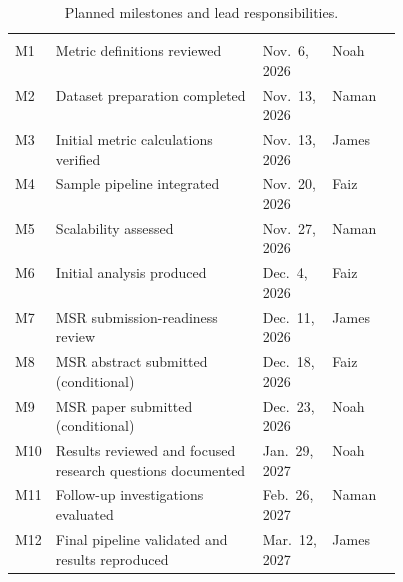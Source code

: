 \begin{singlespace}
\setlength{\LTcapwidth}{\linewidth}
\begin{longtable}{@{}L{0.09\linewidth} L{\tabcolsep\relax} L{0.18\linewidth} L{0.18\linewidth}@{}}
\caption{Planned milestones and lead responsibilities.}\label{tab:proposal-milestones}\\
 &  &  & \\
\midrule
\endfirsthead
{}
 &  &  & \\
\midrule
\endhead
\bottomrule
\endfoot

M1 & Metric definitions reviewed
& Nov.\ 6, 2026 & Noah\\
\addlinespace[3pt]

M2 & Dataset preparation completed
& Nov.\ 13, 2026 & Naman\\
\addlinespace[3pt]

M3 & Initial metric calculations verified
& Nov.\ 13, 2026 & James\\
\addlinespace[3pt]

M4 & Sample pipeline integrated
& Nov.\ 20, 2026 & Faiz\\
\addlinespace[3pt]

M5 & Scalability assessed
& Nov.\ 27, 2026 & Naman\\
\addlinespace[3pt]

M6 & Initial analysis produced
& Dec.\ 4, 2026 & Faiz\\
\addlinespace[3pt]

M7 & MSR submission-readiness review
& Dec.\ 11, 2026 & James\\
\addlinespace[3pt]

M8 & MSR abstract submitted (conditional)
& Dec.\ 18, 2026 & Faiz\\
\addlinespace[3pt]

M9 & MSR paper submitted (conditional)
& Dec.\ 23, 2026 & Noah\\
\addlinespace[3pt]

M10 & Results reviewed and focused research questions documented
& Jan.\ 29, 2027 & Noah\\
\addlinespace[3pt]

M11 & Follow-up investigations evaluated
& Feb.\ 26, 2027 & Naman\\
\addlinespace[3pt]

M12 & Final pipeline validated and results reproduced
& Mar.\ 12, 2027 & James\\

\end{longtable}
\end{singlespace}

